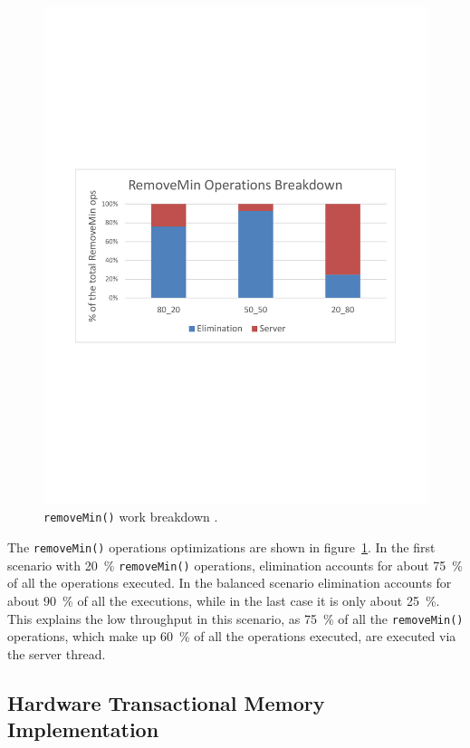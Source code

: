 \begin{figure}[htb]
\begin{minipage}[b]{.495\textwidth}
		\includegraphics[width=\linewidth]{graphics/sparc-rem-brk.pdf}
		\caption{\texttt{removeMin()} work breakdown \cite{calciu_adaptive_2014}.}
		\label{fig:sparc_rem}
	\end{minipage}
\end{figure}

The \texttt{removeMin()} operations optimizations are shown in figure~\ref{fig:sparc_rem}. In the first scenario with 20~\% \texttt{removeMin()} operations, elimination accounts for about 75~\% of all the operations executed. In the balanced scenario elimination accounts for about 90~\% of all the executions, while in the last case it is only about 25~\%. This explains the low throughput in this scenario, as 75~\% of all the \texttt{removeMin()} operations, which make up 60~\% of all the operations executed, are executed via the server thread.

\subsection{Hardware Transactional Memory Implementation}

